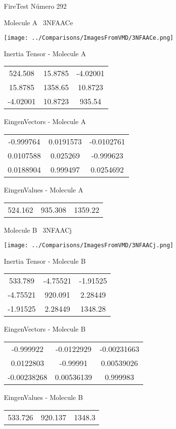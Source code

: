 \vtab[-3cm]
\begin{center}
{\large FireTest \tab Número 292}
\end{center}
\begin{multicols}{2}
\begin{center}

Molecule A \
3NFAACe

\texttt{[image: ../Comparisons/ImagesFromVMD/3NFAACe.png]}

Inertia Tensor - Molecule A \\
\begin{tabular}{|c c c|}
524.508	 & 	15.8785	 & 	-4.02001	 \\
15.8785	 & 	1358.65	 & 	10.8723	 \\
-4.02001	 & 	10.8723	 & 	935.54
\end{tabular}

\vtab
 EingenVectors - Molecule A     \\
\begin{tabular}{|c c c|}
-0.999764	 & 	0.0191573	 & 	-0.0102761	 \\
0.0107588	 & 	0.025269	 & 	-0.999623	 \\
0.0188904	 & 	0.999497	 & 	0.0254692
\end{tabular}

\vtab
 EingenValues - Molecule A     \\
\begin{tabular}{|c c c|}
524.162	 & 	935.308	 & 	1359.22	 \\
\end{tabular}
\columnbreak

Molecule B \
3NFAACj

\texttt{[image: ../Comparisons/ImagesFromVMD/3NFAACj.png]}

Inertia Tensor - Molecule B \\
\begin{tabular}{|c c c|}
533.789	 & 	-4.75521	 & 	-1.91525	 \\
-4.75521	 & 	920.091	 & 	2.28449	 \\
-1.91525	 & 	2.28449	 & 	1348.28
\end{tabular}

\vtab
 EingenVectors - Molecule B     \\
\begin{tabular}{|c c c|}
-0.999922	 & 	-0.0122929	 & 	-0.00231663	 \\
0.0122803	 & 	-0.99991	 & 	0.00539026	 \\
-0.00238268	 & 	0.00536139	 & 	0.999983
\end{tabular}

\vtab
 EingenValues - Molecule B     \\
\begin{tabular}{|c c c|}
533.726	 & 	920.137	 & 	1348.3	 \\
\end{tabular}

\end{center}
\end{multicols}

